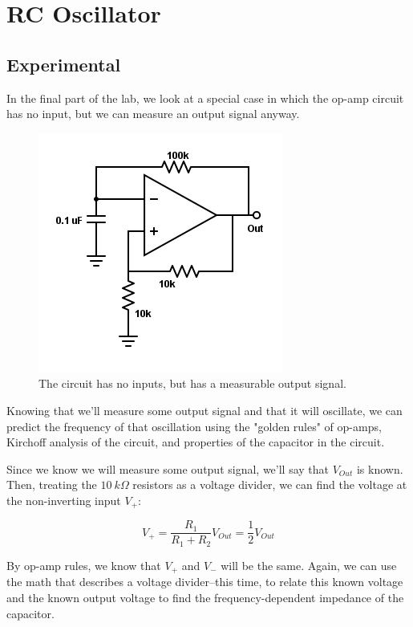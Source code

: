 \documentclass[11pt]{article}
\begin{document}
\section{RC Oscillator}
\subsection{Experimental}

In the final part of the lab, we look at a special case in which the op-amp circuit has no input, but we can measure an output signal anyway.

\begin{figure}[H]
    \centering
    \includegraphics[scale=0.5]{Diagrams/c-f.png}
    \caption{The circuit has no inputs, but has a measurable output signal.}
    \label{circuit:f}
\end{figure}

Knowing that we'll measure some output signal and that it will oscillate, we can predict the frequency of that oscillation using the "golden rules" of op-amps, Kirchoff analysis of the circuit, and properties of the capacitor in the circuit.

Since we know we will measure some output signal, we'll say that $V_{Out}$ is known. Then, treating the $10\ k \Omega$ resistors as a voltage divider, we can find the voltage at the non-inverting input $V_+$:

\begin{equation}
    V_+ = \frac{R_1}{R_1 + R_2} V_{Out} = \frac{1}{2} V_{Out}
\end{equation}

By op-amp rules, we know that $V_+$ and $V_-$ will be the same. Again, we can use the math that describes a voltage divider--this time, to relate this known voltage and the known output voltage to find the frequency-dependent impedance of the capacitor.
\end{document}
